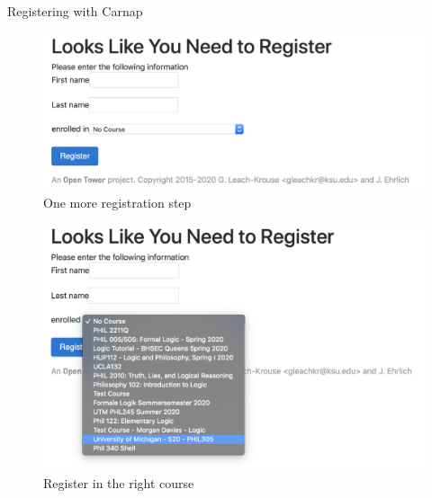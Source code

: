 \documentclass[
  ignorenonframetext,
]{beamer}
\renewcommand{\,}{\text{, }}
\begin{document}
\begin{frame}{Registering with Carnap}
\protect\hypertarget{registering-with-carnap}{}

\begin{figure}
\centering
\includegraphics[width=\textwidth,height=0.8\textheight]{../images/0_1_a_Carnap_Need_Register.png}
\caption{One more registration step}
\end{figure}

\end{frame}

\begin{frame}

\begin{figure}
\centering
\includegraphics[width=\textwidth,height=0.8\textheight]{../images/0_1_a_Registration.png}
\caption{Register in the right course}
\end{figure}

\end{frame}
\end{document}
